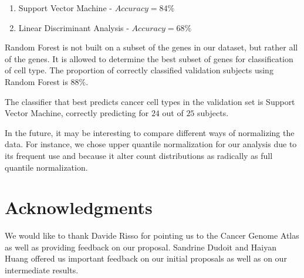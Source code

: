 \begin{enumerate}
\item Support Vector Machine - $Accuracy = 84\% $
\item Linear Discriminant Analysis - $Accuracy =68\% $
\end{enumerate}

Random Forest is not built on a subset of the genes in our dataset, but rather
all of the genes. It is allowed to determine the best subset of genes for
classification of cell type. The proportion of correctly classified validation
subjects using Random Forest is $88\%$.

The classifier that best predicts cancer cell types in the validation set is
Support Vector Machine, correctly predicting for $24$ out of $25$ subjects.

In the future,  it may be interesting to compare different ways of normalizing
the data. For instance, we chose upper quantile normalization for our analysis
due to its frequent use and because it alter count distributions as radically
as full quantile normalization.


\section*{Acknowledgments}

We would like to thank Davide Risso for pointing us to the Cancer Genome Atlas
as well as providing feedback on our proposal. Sandrine Dudoit and Haiyan Huang
offered us important feedback on our initial proposals as well as on our
intermediate results. 




